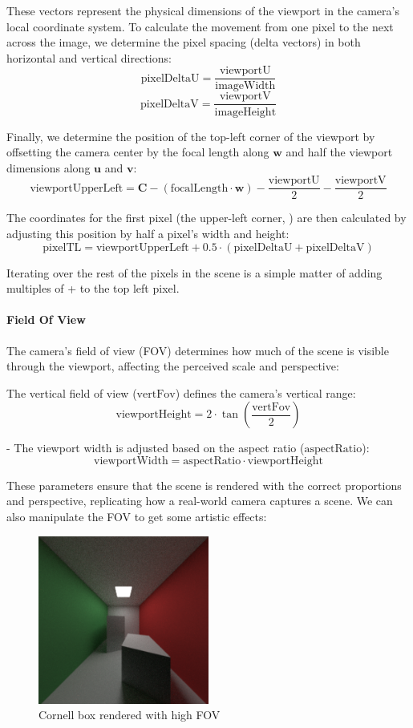 \documentclass[12pt]{article}
\begin{document}
These vectors represent the physical dimensions of the viewport in the camera's local coordinate system. To calculate the movement from one pixel to the next across the image, we determine the pixel spacing (delta vectors) in both horizontal and vertical directions:
\[
    \text{pixelDeltaU} = \frac{\text{viewportU}}{\text{imageWidth}}
\]
\[
    \text{pixelDeltaV} = \frac{\text{viewportV}}{\text{imageHeight}}
\]

Finally, we determine the position of the top-left corner of the viewport  by offsetting the camera center by the focal length along $\mathbf{w}$ and half the viewport dimensions along $\mathbf{u}$ and $\mathbf{v}$:
\[
    \text{viewportUpperLeft} = \mathbf{C} - (\text{focalLength} \cdot \mathbf{w}) - \frac{\text{viewportU}}{2} - \frac{\text{viewportV}}{2}
\]

The coordinates for the first pixel (the upper-left corner, ) are then calculated by adjusting this position by half a pixel's width and height:
\[
    \text{pixelTL} = \text{viewportUpperLeft} + 0.5 \cdot (\text{pixelDeltaU} + \text{pixelDeltaV})
\]

Iterating over the rest of the pixels in the scene is a simple matter of adding multiples of  +  to the top left pixel.

\paragraph{Field Of View} The camera's field of view (FOV) determines how much of the scene is visible through the viewport, affecting the perceived scale and perspective:

The vertical field of view (\(\text{vertFov}\)) defines the camera's vertical range:
\[
    \text{viewportHeight} = 2 \cdot \tan\left(\frac{\text{vertFov}}{2}\right)
\]

- The viewport width is adjusted based on the aspect ratio (\(\text{aspectRatio}\)):
\[
    \text{viewportWidth} = \text{aspectRatio} \cdot \text{viewportHeight}
\]

These parameters ensure that the scene is rendered with the correct proportions and perspective, replicating how a real-world camera captures a scene. We can also manipulate the FOV to get some artistic effects:

\begin{figure}[H]
    \centering
    \includegraphics[width=0.5\textwidth]{images/artsy_rep/highFOV_cornell.png}
    \caption{Cornell box rendered with high FOV}
    \label{fig:highFOVBox}
\end{figure}
\end{document}
